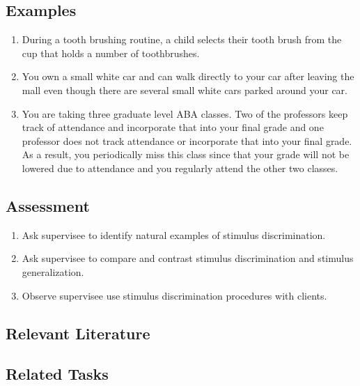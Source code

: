 \subsection{Examples}
\begin{enumerate}
\item During a tooth brushing routine, a child selects their tooth brush from the cup that holds a number of toothbrushes.
\item You own a small white car and can walk directly to your car after leaving the mall even though there are several small white cars parked around your car.
\item You are taking three graduate level ABA classes.  Two of the professors keep track of attendance and incorporate that into your final grade and one professor does not track attendance or incorporate that into your final grade.  As a result, you periodically miss this class since that your grade will not be lowered due to attendance and you regularly attend the other two classes. 
%
\end{enumerate}
%
\subsection{Assessment}
\begin{enumerate}
\item Ask supervisee to identify natural examples of stimulus discrimination.
\item Ask supervisee to compare and contrast stimulus discrimination and stimulus generalization.
\item Observe supervisee use stimulus discrimination procedures with clients.
%
\end{enumerate}
%
\subsection{Relevant Literature}
\begin{refsection}
\nocite{test,alang2017police,clayton2018black}
\printbibliography[heading=none]
\end{refsection}
%
\subsection{Related Tasks}
\foureSix{}\\
\fourFKEleven{}\\
\fourFKTwentyFour{}\\
\fourFKThirtyFour{}\\
\fourFKThirtySeven{}\\
%
%
%
%
%
%
